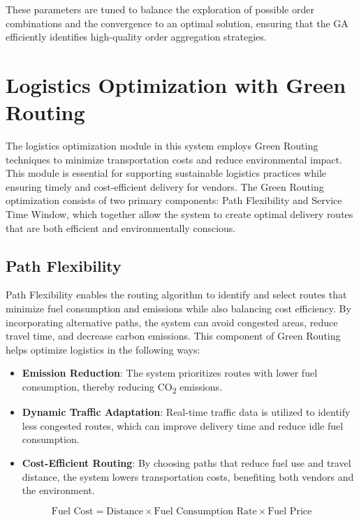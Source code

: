 These parameters are tuned to balance the exploration of possible order combinations and the convergence to an optimal solution, ensuring that the GA efficiently identifies high-quality order aggregation strategies.

\section{Logistics Optimization with Green Routing}

The logistics optimization module in this system employs Green Routing techniques to minimize transportation costs and reduce environmental impact. This module is essential for supporting sustainable logistics practices while ensuring timely and cost-efficient delivery for vendors. The Green Routing optimization consists of two primary components: Path Flexibility and Service Time Window, which together allow the system to create optimal delivery routes that are both efficient and environmentally conscious.

\subsection{Path Flexibility}

Path Flexibility enables the routing algorithm to identify and select routes that minimize fuel consumption and emissions while also balancing cost efficiency. By incorporating alternative paths, the system can avoid congested areas, reduce travel time, and decrease carbon emissions. This component of Green Routing helps optimize logistics in the following ways:

\begin{itemize}
    \item \textbf{Emission Reduction}: The system prioritizes routes with lower fuel consumption, thereby reducing CO\textsubscript{2} emissions.
    \item \textbf{Dynamic Traffic Adaptation}: Real-time traffic data is utilized to identify less congested routes, which can improve delivery time and reduce idle fuel consumption.
    \item \textbf{Cost-Efficient Routing}: By choosing paths that reduce fuel use and travel distance, the system lowers transportation costs, benefiting both vendors and the environment.
\end{itemize}

\begin{equation}
    \text{Fuel Cost} = \text{Distance} \times \text{Fuel Consumption Rate} \times \text{Fuel Price}
\end{equation}

